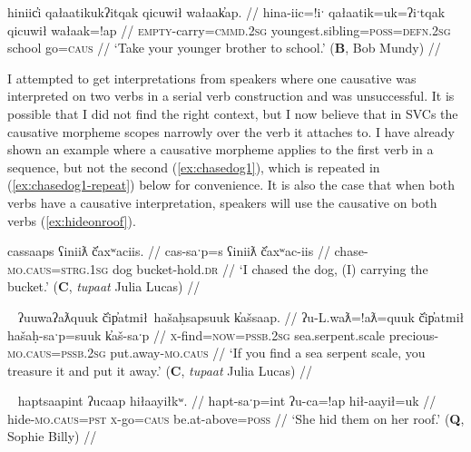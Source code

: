 \ex \label{ex:takebrothertoschool}
\begingl
\glpreamble hiniic̓i qałaatikukʔitqak qicuwił wałaak̓ap. //
\gla hina-iic=!iˑ qałaatik=uk=ʔiˑtqak qicuwił wałaak=!ap //
\glb \textsc{empty}-carry=\textsc{cmmd.2sg} youngest.sibling=\textsc{poss}=\textsc{defn.2sg} school go=\textsc{caus} //
\glft `Take your younger brother to school.' (\textbf{B}, Bob Mundy) //
\endgl
\xe

I attempted to get interpretations from speakers where one causative was interpreted on two verbs in a serial verb construction and was unsuccessful. It is possible that I did not find the right context, but I now believe that in SVCs the causative morpheme scopes narrowly over the verb it attaches to. I have already shown an example where a causative morpheme applies to the first verb in a sequence, but not the second (\ref{ex:chasedog1}), which is repeated in (\ref{ex:chasedog1-repeat}) below for convenience. It is also the case that when both verbs have a causative interpretation, speakers will use the causative on both verbs (\ref{ex:hideonroof}).

\ex \label{ex:chasedog1-repeat}
\begingl
\glpreamble cassaaps ʕiniiƛ č̓axʷaciis. //
\gla cas-saˑp=s ʕiniiƛ č̓axʷac-iis //
\glb chase-\textsc{mo.caus}=\textsc{strg.1sg} dog bucket-hold.\textsc{dr} //
\glft `I chased the dog, (I) carrying the bucket.' (\textbf{C}, \textit{tupaat} Julia Lucas) //
\endgl
\xe

\ex~ \label{ex:makepreciousputaway}
\begingl
\glpreamble ʔuuwaʔaƛquuk č̓ip̓atmił\footnotemark\ hašaḥsapsuuk k̓ašsaap. //
\gla ʔu-L.waƛ=!aƛ=quuk č̓ip̓atmił hašaḥ-saˑp=suuk k̓aš-saˑp //
\glb \textsc{x}-find=\textsc{now}=\textsc{pssb.2sg} sea.serpent.scale precious-\textsc{mo.caus}=\textsc{pssb.2sg} put.away-\textsc{mo.caus} //
\glft `If you find a sea serpent scale, you treasure it and put it away.' (\textbf{C}, \textit{tupaat} Julia Lucas) //
\endgl
\xe


\ex~ \label{ex:hideonroof}
\begingl
\glpreamble haptsaapint ʔucaap hiłaayiłkʷ. //
\gla hapt-saˑp=int ʔu-ca=!ap hił-aayił=uk //
\glb hide-\textsc{mo.caus}=\textsc{pst} \textsc{x}-go=\textsc{caus} be.at-above=\textsc{poss} //
\glft `She hid them on her roof.' (\textbf{Q}, Sophie Billy) //
\endgl
\xe


